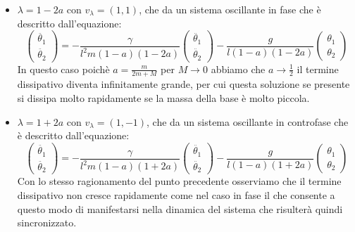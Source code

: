 \begin{itemize}
	\item $\lambda=1-2a$ con $v_{\lambda}=(1,1)$, che da un sistema oscillante in fase che è descritto dall'equazione:
	\begin{equation*}
			\begin{pmatrix}
				\ddot{\theta_1} \\
				\ddot{\theta_2}
			\end{pmatrix}
			=-\frac{\gamma}{l^2m(1-a)(1-2a)}
			\begin{pmatrix}
				\ddot{\theta_1} \\
				\ddot{\theta_2}
			\end{pmatrix}
			-\frac{g}{l(1-a)(1-2a)}
			\begin{pmatrix}
				\theta_1 \\
				\theta_2
			\end{pmatrix}
	\end{equation*}
In questo caso poichè $a=\frac{m}{2m+M}$ per $M\rightarrow0$ abbiamo che $a\rightarrow\frac{1}{2}$ il termine dissipativo diventa infinitamente grande, per cui questa soluzione se presente si dissipa molto rapidamente se la massa della base è molto piccola.
\item $\lambda=1+2a$ con $v_{\lambda}=(1,-1)$, che da un sistema oscillante in controfase che è descritto dall'equazione:
\begin{equation*}
	\begin{pmatrix}
		\ddot{\theta_1} \\
		\ddot{\theta_2}
	\end{pmatrix}
	=-\frac{\gamma}{l^2m(1-a)(1+2a)}
	\begin{pmatrix}
		\ddot{\theta_1} \\
		\ddot{\theta_2}
	\end{pmatrix}
	-\frac{g}{l(1-a)(1+2a)}
	\begin{pmatrix}
		\theta_1 \\
		\theta_2
	\end{pmatrix}
\end{equation*}
Con lo stesso ragionamento del punto precedente osserviamo che il termine dissipativo non cresce rapidamente come nel caso in fase il che consente a questo modo di manifestarsi nella dinamica del sistema che risulterà quindi sincronizzato.
\end{itemize} 
